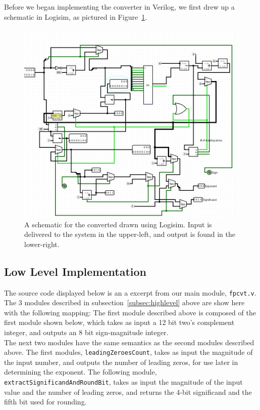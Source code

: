 \documentclass[]{article}
\begin{document}
Before we began implementing the converter in Verilog, we first drew up a schematic in Logisim, as pictured in Figure~\ref{fig:logisim}.\\

\begin{figure}[H]
\centering
\includegraphics[width=11cm]{logisim.PNG}
\caption{A schematic for the converted drawn using Logisim. Input is delivered to the system in the upper-left, and output is found in the lower-right.}
\label{fig:logisim}
\end{figure}

\subsection{Low Level Implementation}

The source code displayed below is an a excerpt from our main module, \texttt{fpcvt.v}. The 3 modules described in subsection~\ref{subsec:highlevel} above are show here with the following mapping: The first module described above is composed of the first module shown below, which takes as input a 12 bit two's complement integer, and outputs an 8 bit sign-magnitude integer.\\

The next two modules have the same semantics as the second modules described above. The first modules, \texttt{leadingZeroesCount}, takes as input the magnitude of the input number, and outputs the number of leading zeros, for use later in determining the exponent. The following module, \texttt{extractSignificandAndRoundBit}, takes as input the magnitude of the input value and the number of leading zeros, and returns the 4-bit significand and the fifth bit used for rounding.\\
\end{document}
